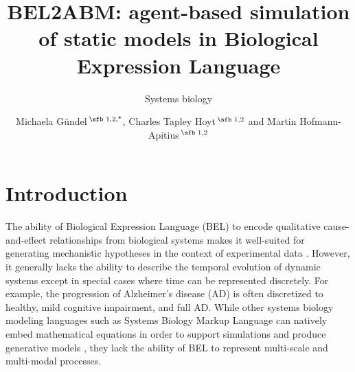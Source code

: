 \documentclass{bioinfo}
\begin{document}

\subtitle{Systems biology}

\title[BEL2ABM]{BEL2ABM: agent-based simulation of static models in Biological Expression Language}
\author[G{\"u}ndel \textit{et~al}.]{Michaela G{\"u}ndel\,$^{\text{\sfb 1,2,*}}$, Charles Tapley Hoyt\,$^{\text{\sfb 1,2}}$ and Martin Hofmann-Apitius\,$^{\text{\sfb 1,2}}$}
\address{$^{\text{\sf 1}}$Department of Bioinformatics, Fraunhofer Institute for Algorithms and Scientific Computing (SCAI), Sankt Augustin, 53754, Germany \\
$^{\text{\sf 2}}$Department of Life Science Informatics, Bonn-Aachen International Center for IT, Rheinische Friedrich-Wilhelms-Universit{\"a}t Bonn, Bonn, 53113, Germany.}



\maketitle

\section{Introduction}

The ability of Biological Expression Language (BEL) to encode qualitative cause-and-effect relationships 
from biological systems makes it well-suited for generating mechanistic hypotheses in the context of 
experimental data \citep{Catlett13}. However, it generally lacks the ability to describe the temporal evolution of dynamic systems except in special cases where time can be represented discretely. For example, the 
progression of Alzheimer's disease (AD) is often discretized to healthy, mild cognitive impairment, and full AD. 
While other systems biology modeling languages such as Systems Biology Markup Language can natively embed mathematical equations in order to support simulations and produce generative models \citep{Hucka03},
they lack the ability of BEL to represent multi-scale and multi-modal processes. 
\end{document}
